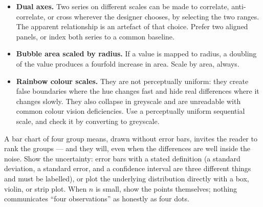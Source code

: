 \begin{cautionbox}
\begin{itemize}
  \item \textbf{Dual axes.} Two series on different scales can be made to
        correlate, anti-correlate, or cross wherever the designer chooses, by
        selecting the two ranges. The apparent relationship is an artefact of
        that choice. Prefer two aligned panels, or index both series to a common
        baseline.
  \item \textbf{Bubble area scaled by radius.} If a value is mapped to radius,
        a doubling of the value produces a fourfold increase in area. Scale by
        area, always.
  \item \textbf{Rainbow colour scales.} They are not perceptually uniform:
        they create false boundaries where the hue changes fast and hide real
        differences where it changes slowly. They also collapse in greyscale
        and are unreadable with common colour vision deficiencies. Use a
        perceptually uniform sequential scale, and check it by converting to
        greyscale.
\end{itemize}
\end{cautionbox}

\begin{cautionbox}
A bar chart of four group means, drawn without error bars, invites the reader
to rank the groups --- and they will, even when the differences are well inside
the noise. Show the uncertainty: error bars with a stated definition
(a standard deviation, a standard error, and a confidence interval are three
different things and must be labelled), or plot the underlying distribution
directly with a box, violin, or strip plot. When $n$ is small, show the points
themselves; nothing communicates ``four observations'' as honestly as four
dots.
\end{cautionbox}

